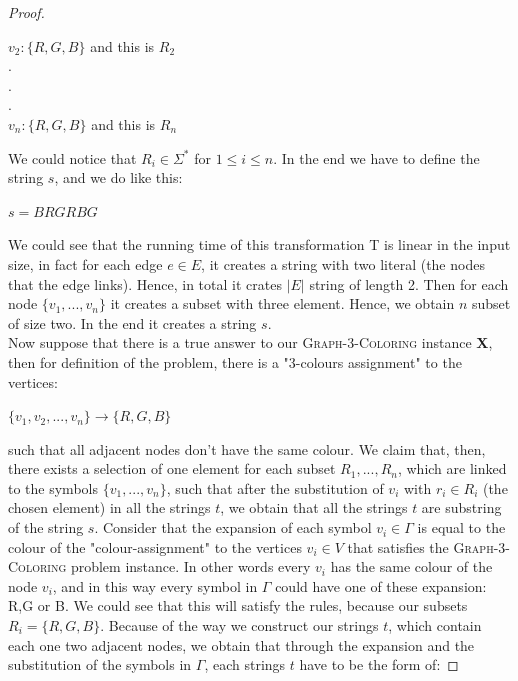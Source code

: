 \documentclass[paper=a4, fontsize=11pt]{scrartcl}
\numberwithin{equation}{section}		%
\numberwithin{figure}{section}			%
\numberwithin{table}{section}				%
\begin{document}
\begin{proof}
\begin{center}
     	$v_2: \{R,G,B\}$ and this is $R_2$ \\
     	$.$ \\
     	$.$ \\
     	$.$ \\
     	$v_n: \{R,G,B\}$ and this is $R_n$
     \end{center}
     We could notice that $R_i \in \Sigma^*$ for $1 \leq i \leq n$. \newline
     In the end we have to define the string $s$, and we do like this:
     \begin{center}
        $s=BRGRBG$
     \end{center}	
     We could see that the running time of this transformation T is linear in the input size, in fact for each edge $e\in E$, it creates a string with two literal (the nodes that the edge links). Hence, in total it crates $|E|$ string of length 2. Then for each node $\{v_1,...,v_n\}$ it creates a subset with three element. Hence, we obtain $n$ subset of size two. In the end it creates a string $s$. \newline
     \\
     \noindent Now suppose that there is a true answer to our \textsc{Graph-3-Coloring} instance \textbf{X}, then for definition of the problem, there is a "3-colours assignment" to the vertices:
     \begin{center}
     	$\{v_1,v_2,...,v_n\} \rightarrow \{R,G,B\}$
     \end{center} 
     such that all adjacent nodes don't have the same colour. We claim that, then, there exists a selection of one element for each subset $R_1,...,R_n$, which are linked to the symbols $\{v_1,...,v_n\}$, such that after the substitution of $v_i$ with $r_i \in R_i$ (the chosen element) in all the strings $t$, we obtain that all the strings $t$ are substring of the string $s$. Consider that the expansion of each symbol $v_i \in \Gamma$ is equal to the colour of the "colour-assignment" to the vertices $v_i \in V$ that satisfies the \textsc{Graph-3-Coloring} problem instance. In other words every $v_i$ has the same colour of the node $v_i$, and in this way every symbol in $\Gamma$ could have one of these expansion: R,G or B. We could see that this will satisfy the rules, because our subsets $R_i = \{R,G,B\}$. \newline
     Because of the way we construct our strings $t$, which contain each one two adjacent nodes, we obtain that through the expansion and the substitution of the symbols in $\Gamma$, each strings $t$ have to be the form of:

\end{proof}
\end{document}
